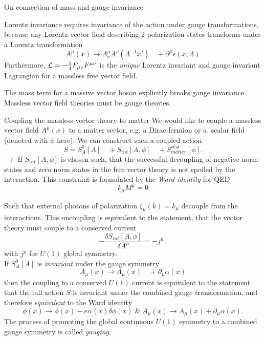 \begin{mybox}{On connection of mass and gauge invariance}
	
Lorentz invariance requires invariance of the action under gauge transformations, because any Lorentz vector field describing 2 polarization  states transforms under a Lorentz transformation 
\begin{equation}
	A^{\mu}(x) \rightarrow \Lambda^{\mu}_{\nu} A^{\nu} (\Lambda^{-1} x') \quad + \partial^{\mu} \epsilon (x,\Lambda)
\end{equation}
Furthermore, $\mathcal{L} = -\frac{1}{4} F_{\mu \nu} F^{\mu \nu}$ is the \emph{unique} Lorentz invariant and gauge invariant Lagrangian for a massless free vector field.
\begin{statements}
	The mass term for a massive vector boson explicitly breaks gauge invariance. Massless vector field theories must be gauge theories.
\end{statements}
\end{mybox}
\begin{mybox}{Coupling the massless vector theory to matter}
	We would like to couple a massless vector field $A^{\mu}(x)$ to a matter sector, e.g. a Dirac fermion or a. scalar field (denoted with $\phi$ here). We can construct such a coupled action
	\begin{equation}
		S = S^0_A[A] \quad +S_{int} [A,\phi] \quad + S^{rest}_{matter} [\phi].
	\end{equation}
$\rightarrow$	If $S_{int}[A,\phi]$ is chosen such, that the successful decoupling of negative norm states and zero norm states in the free vector theory is not spoiled by the interaction. This constraint is formulated by the \emph{Ward identity} for QED
\begin{equation}
	k_{\mu} M^{\mu} =0
\end{equation}
\end{mybox}
Such that external photons of polarization $\zeta_{\mu} (k) = k_{\mu}$ decouple from the interactions. This uncoupling is equivalent to the statement, that the vector theory must couple to a conserved current 
\begin{equation}
	- \frac{\delta S_{int} [A,\phi]}{\delta A^{\mu}} = - j^{\mu},
\end{equation}
with $j^{\mu}$ for $U(1)$ global symmetry.\\
If $S^0_A[A]$ is \emph{invariant} under the gauge symmetry
\begin{equation}
	A_{\mu}(x) \rightarrow A_{\mu} (x) \quad + \partial_{\mu} \alpha(x)
\end{equation}
then the coupling to a conserved $U(1)$ current is equivalent to the statement that the full action $S$ is invariant under the combined gauge transformation, and therefore \emph{equivalent} to the Ward identity 
\begin{equation}
	\phi(x) \rightarrow \phi(x) - e \alpha(x) \delta\phi(x) \; \& \; A_{\mu}(x) \rightarrow A_{\mu}(x) + \partial_{\mu} \alpha(x).
\end{equation}
The process of promoting the global continuous $U(1)$ symmetry to a combined gauge symmetry is called \emph{gauging}.

